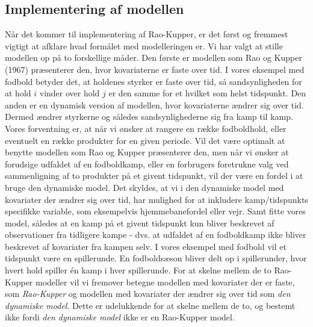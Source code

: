 \documentclass[11pt,a4paper]{article}
\begin{document}
\subsection{Implementering af modellen}
Når det kommer til implementering af Rao-Kupper, er det først og fremmest vigtigt at afklare hvad formålet med modelleringen er. Vi har valgt at stille modellen op på to forskellige måder. Den første er modellen som Rao og Kupper (1967)\cite{RaoKupper} præsenterer den, hvor kovariaterne er faste over tid. I vores eksempel med fodbold betyder det, at holdenes styrker er faste over tid, så sandsynligheden for at hold $i$ vinder over hold $j$ er den samme for et hvilket som helst tidspunkt.
Den anden er en dynamisk version af modellen, hvor kovariaterne ændrer sig over tid. Dermed ændrer styrkerne og således sandsynlighederne sig fra kamp til kamp. Vores forventning er, at når vi ønsker at rangere en række fodboldhold, eller eventuelt en række produkter for en given periode. Vil det være optimalt at benytte modellen som Rao og Kupper præsenterer den, men når vi ønsker at forudsige udfaldet af en fodboldkamp, eller en forbrugers foretrukne valg ved sammenligning af to produkter på et givent tidspunkt, vil der være en fordel i at bruge den dynamiske model. Det skyldes, at vi i den dynamiske model med kovariater der ændrer sig over tid, har mulighed for at inkludere kamp/tidspunkts specifikke variable, som eksempelvis hjemmebanefordel eller vejr. Samt fitte vores model, således at en kamp på et givent tidspunkt kun bliver beskrevet af observationer fra tidligere kampe - dvs. at udfaldet af en fodboldkamp ikke bliver beskrevet af kovariater fra kampen selv.
I vores eksempel med fodbold vil et tidspunkt være en spillerunde. En fodboldsæson bliver delt op i spillerunder, hvor hvert hold spiller én kamp i hver spillerunde. For at skelne mellem de to Rao-Kupper modeller vil vi fremover betegne modellen med kovariater der er faste, som \textit{Rao-Kupper} og modellen med kovariater der ændrer sig over tid som \textit{den dynamiske model}. Dette er udelukkende for at skelne mellem de to, og bestemt ikke fordi \textit{den dynamiske model} ikke er en Rao-Kupper model.
\end{document}
